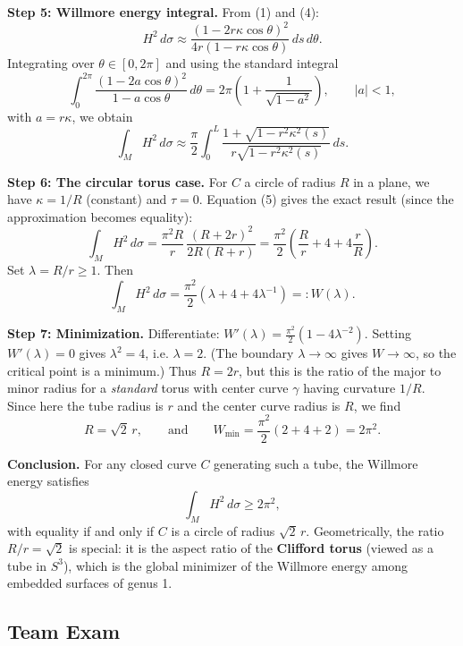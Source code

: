 \begin{solution}
\textbf{Step 5: Willmore energy integral.}
From (1) and (4):
\[
H^2\,d\sigma \approx \frac{(1-2r\kappa\cos\theta)^2}{4r(1-r\kappa\cos\theta)}\,ds\,d\theta.
\]
Integrating over $\theta\in[0,2\pi]$ and using the standard integral
\[
\int_0^{2\pi}\frac{(1-2a\cos\theta)^2}{1-a\cos\theta}\,d\theta
= 2\pi\!\left(1+\frac{1}{\sqrt{1-a^2}}\right),\qquad |a|<1,
\]
with $a=r\kappa$, we obtain
\[
\int_M H^2\,d\sigma \approx \frac{\pi}{2}\int_0^L
\frac{1+\sqrt{1-r^2\kappa^2(s)}}{r\sqrt{1-r^2\kappa^2(s)}}\,ds.
\tag{5}
\]

\textbf{Step 6: The circular torus case.}
For $C$ a circle of radius $R$ in a plane, we have $\kappa=1/R$ (constant) and $\tau=0$.
Equation (5) gives the exact result (since the approximation becomes equality):
\[
\int_M H^2\,d\sigma = \frac{\pi^2 R}{r}\,\frac{(R+2r)^2}{2R(R+r)}
= \frac{\pi^2}{2}\left(\frac{R}{r}+4+4\frac{r}{R}\right).
\tag{6}
\]
Set $\lambda = R/r \geq 1$.  Then
\[
\int_M H^2\,d\sigma = \frac{\pi^2}{2}\!\left(\lambda+4+4\lambda^{-1}\right)
=: W(\lambda).
\]

\textbf{Step 7: Minimization.}
Differentiate: $W'(\lambda) = \frac{\pi^2}{2}\!\left(1-4\lambda^{-2}\right)$.
Setting $W'(\lambda)=0$ gives $\lambda^2=4$, i.e. $\lambda=2$.
(The boundary $\lambda\to\infty$ gives $W\to\infty$, so the critical point is a minimum.)
Thus $R=2r$, but this is the ratio of the major to minor radius for a \emph{standard} torus with center curve $\gamma$ having curvature $1/R$.  Since here the tube radius is $r$ and the center curve radius is $R$, we find
\[
R = \sqrt{2}\,r,
\qquad\text{and}\qquad
W_{\min} = \frac{\pi^2}{2}(2+4+2) = 2\pi^2.
\]

\textbf{Conclusion.}
For any closed curve $C$ generating such a tube, the Willmore energy satisfies
\[
\int_M H^2\,d\sigma \geq 2\pi^2,
\]
with equality if and only if $C$ is a circle of radius $\sqrt{2}\,r$.
Geometrically, the ratio $R/r=\sqrt{2}$ is special: it is the aspect ratio of the \textbf{Clifford torus} (viewed as a tube in $S^3$), which is the global minimizer of the Willmore energy among embedded surfaces of genus 1.
\end{solution}

\subsection{Team Exam}

